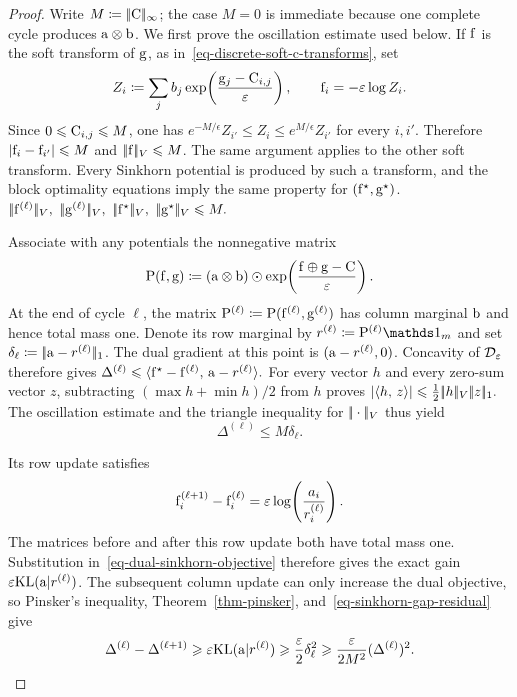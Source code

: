 \begin{proof}
Write $M\coloneqq|\!| \mathrm{C} |\!|_\infty$; the case $M=0$ is immediate because one complete cycle produces $\mathrm{a}\otimes\mathrm{b}$. We first prove the oscillation estimate used below. If $\mathrm{f}$ is the soft transform of $\mathrm{g}$, as in~\eqref{eq-discrete-soft-c-transforms}, set
\[
Z_i\coloneqq\sum_j b_j\exp\!\left(\frac{\mathrm{g}_j-\mathrm{C}_{i,j}}{\varepsilon}\right),
\qquad \mathrm{f}_i=-\varepsilon\log Z_i.
\]
Since $0\leqslant \mathrm{C}_{i,j}\leqslant M$, one has $e^{-M/\epsilon}Z_{i'}\leq Z_i\leq e^{M/\epsilon}Z_{i'}$ for every $i,i'$. Therefore $\left\lvert\mathrm{f}_i-\mathrm{f}_{i'}\right\rvert\leqslant M$ and $|\!| \mathrm{f} |\!|_V\leqslant M$. The same argument applies to the other soft transform. Every Sinkhorn potential is produced by such a transform, and the block optimality equations imply the same property for $(\mathrm{f}^\star,\mathrm{g}^\star)$.
\(\norm{\fD^{(\ell)}}_V,\ \norm{\gD^{(\ell)}}_V, \ \norm{\fD^\star}_V,\ \norm{\gD^\star}_V \leq M.\)

Associate with any potentials the nonnegative matrix
\[
\mathrm{P}(\mathrm{f},\mathrm{g})
\coloneqq
(\mathrm{a}\otimes\mathrm{b})
\odot
\exp\!\left(\frac{\mathrm{f}\oplus\mathrm{g}-\mathrm{C}}{\varepsilon}\right).
\]
At the end of cycle $\ell$, the matrix $\mathrm{P}^{(\ell)}\coloneqq\mathrm{P}(\mathrm{f}^{(\ell)},\mathrm{g}^{(\ell)})$ has column marginal $\mathrm{b}$ and hence total mass one. Denote its row marginal by $r^{(\ell)}\eqdef\P^{(\ell)}\ones_m$ and set $\delta_\ell\coloneqq|\!| \mathrm{a}-r^{(\ell)} |\!|_1$. The dual gradient at this point is $(\mathrm{a}-r^{(\ell)},0)$. Concavity of $\mathcal{D}_\varepsilon$ therefore gives
\(\Delta^{(\ell)} \leqslant \langle \mathrm{f}^\star-\mathrm{f}^{(\ell)},\,\mathrm{a}-r^{(\ell)}\rangle.\)
For every vector $h$ and every zero-sum vector $z$, subtracting $(\max h+\min h)/2$ from $h$ proves
\(\left\lvert\langle h,\,z\rangle\right\rvert \leqslant \frac12|\!| h |\!|_V|\!| z |\!|_1.\)
The oscillation estimate and the triangle inequality for $|\!| \cdot |\!|_V$ thus yield
\begin{equation}\label{eq-sinkhorn-gap-residual}
\Delta^{(\ell)}\leq M\delta_\ell.
\end{equation}

Its row update satisfies
\[
\mathrm{f}_i^{(\ell+1)}-\mathrm{f}_i^{(\ell)}
=
\varepsilon\log\!\left(\frac{a_i}{r_i^{(\ell)}}\right).
\]
The matrices before and after this row update both have total mass one. Substitution in~\eqref{eq-dual-sinkhorn-objective} therefore gives the exact gain $\varepsilon\mathrm{KL}(\mathrm{a}|r^{(\ell)})$. The subsequent column update can only increase the dual objective, so Pinsker's inequality, Theorem~\ref{thm-pinsker}, and~\eqref{eq-sinkhorn-gap-residual} give
\[
\Delta^{(\ell)}-\Delta^{(\ell+1)}
\geqslant
\varepsilon\mathrm{KL}(\mathrm{a}|r^{(\ell)})
\geqslant
\frac{\varepsilon}{2}\delta_\ell^2
\geqslant
\frac{\varepsilon}{2M^2}(\Delta^{(\ell)})^2.
\]


\end{proof}
